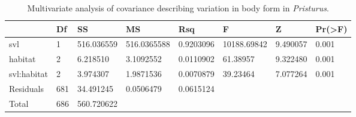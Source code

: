 \documentclass[
  11pt,
]{article}
\begin{document}
\newpage

\begin{table}[H]

\caption{\label{tab:unnamed-chunk-1}Multivariate analysis of covariance describing variation in body form in \textit{Pristurus}.}
\centering
\begin{tabular}[t]{llllllll}
\toprule
  & Df & SS & MS & Rsq & F & Z & Pr(>F)\\
\midrule
svl & 1 & 516.036559 & 516.0365588 & 0.9203096 & 10188.69842 & 9.490057 & 0.001\\
habitat & 2 & 6.218510 & 3.1092552 & 0.0110902 & 61.38957 & 9.322480 & 0.001\\
svl:habitat & 2 & 3.974307 & 1.9871536 & 0.0070879 & 39.23464 & 7.077264 & 0.001\\
Residuals & 681 & 34.491245 & 0.0506479 & 0.0615124 &  &  & \\
Total & 686 & 560.720622 &  &  &  &  & \\
\bottomrule
\end{tabular}
\end{table}

\newpage
\end{document}
